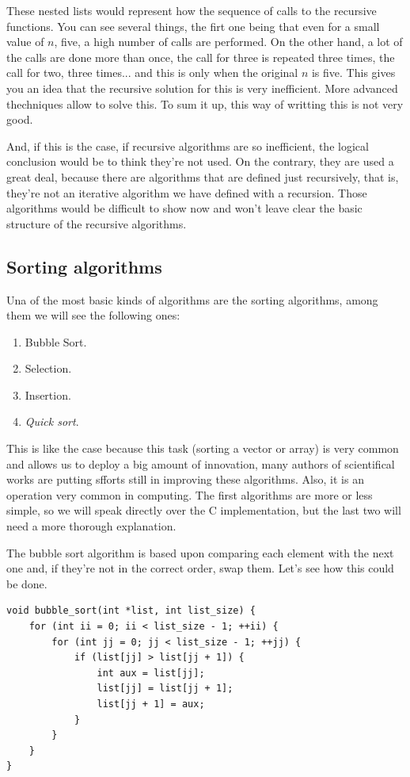 \documentclass[a4paper]{article}
\begin{document}
These nested lists would represent how the sequence of calls to the recursive
functions. You can see several things, the firt one being that even for a
small value of $n$, five, a high number of calls are performed. On the other
hand, a lot of the calls are done more than once, the call for three is repeated
three times, the call for two, three times... and this is only when the original
$n$ is five. This gives you an idea that the recursive solution for this is
very inefficient. More advanced thechniques allow to solve this. To sum it up,
this way of writting this is not very good.

And, if this is the case, if recursive algorithms are so inefficient, the
logical conclusion would be to think they're not used. On the contrary, they are
used a great deal, because there are algorithms that are defined just
recursively, that is, they're not an iterative algorithm we have defined with a
recursion. Those algorithms would be difficult to show now and won't leave clear
the basic structure of the recursive algorithms.

\subsection{Sorting algorithms}
Una of the most basic kinds of algorithms are the sorting algorithms, among
them we will see the following ones:
\begin{enumerate}
\item Bubble Sort.
\item Selection.
\item Insertion.
\item \textit{Quick sort}.
\end{enumerate}

This is like the case because this task (sorting a vector or array) is very
common and allows us to deploy a big amount of innovation, many authors of
scientifical works are putting sfforts still in improving these algorithms.
Also, it is an operation very common in computing. The first algorithms are more
or less simple, so we will speak directly over the C implementation, but the
last two will need a more thorough explanation.

The bubble sort algorithm is based upon comparing each element with the next one
and, if they're not in the correct order, swap them. Let's see how this could be
done.

\noindent
\begin{minipage}[H]{\linewidth}
\mbox{}
\begin{lstlisting}[style=C,
caption={Bubble sort implementation},
label={lst:bubbleSort}]
void bubble_sort(int *list, int list_size) {
    for (int ii = 0; ii < list_size - 1; ++ii) {
        for (int jj = 0; jj < list_size - 1; ++jj) {
            if (list[jj] > list[jj + 1]) {
                int aux = list[jj];
                list[jj] = list[jj + 1];
                list[jj + 1] = aux;
            }
        }
    }
}
\end{lstlisting}
\end{minipage}
\end{document}
